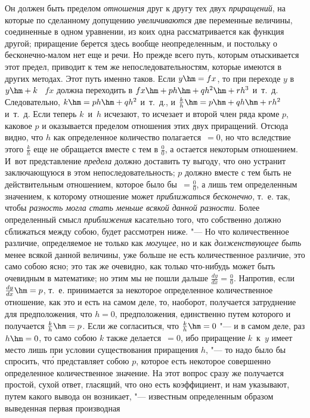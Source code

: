 Он должен быть пределом {\em отношения} друг к другу тех двух {\em приращений},
на которые по сделанному допущению {\em увеличиваются} две переменные величины,
соединенные в одном уравнении, из коих одна рассматривается как функция другой;
приращение берется здесь вообще неопределенным, и постольку о бесконечно-малом
нет еще и речи. Но прежде всего путь, которым отыскивается этот предел,
приводит к тем же непоследовательностям, которые имеются в других методах. Этот
путь именно таков. Если $y\hm=fx$, то при переходе $y$ в $y\hm+k$ \  $fx$
должна переходить в $fx\hm+ph\hm+qh^2\hm+rh^3$ и~т.~д. Следовательно,
$k\hm=ph\hm+qh^2$ и~т.~д., и $\frac k h\hm=p\hm+qh\hm+rh^2$ и~т.~д. Если теперь
$k$~и~$h$ исчезают, то исчезает и второй член ряда кроме $p$, каковое $p$ и
оказывается пределом отношения этих двух приращений. Отсюда видно, что $h$ как
определенное количество полагается~$=0$, но что вследствие этого $\frac k h$
еще не обращается вместе с тем в $\frac 0 0$, а остается некоторым отношением.
И~вот представление {\em предела} должно доставить ту выгоду, что оно устранит
заключающуюся в этом непоследовательность; $p$ должно вместе с тем быть не
действительным отношением, которое было бы~$=\frac 0 0$, а лишь тем
определенным значением, к которому отношение может
{\em приближаться бесконечно}, т.~е. так, чтобы {\em разность могла стать
меньше всякой данной разности}. Более определенный смысл {\em приближения}
касательно того, что собственно должно сближаться между собою, будет рассмотрен
ниже. "--- Но что количественное различие, определяемое не только как {\em
могущее}, но и как {\em долженствующее быть} менее всякой данной величины, уже
больше не есть количественное различие, это само собою ясно; это так же
очевидно, как только что-нибудь может быть очевидным в математике; но этим мы
не пошли дальше $\frac{dy}{dx}=\frac 0 0$. Напротив, если $\frac{dy}{dx}\hm=p$,
т.~е. принимается за некоторое определенное количественное отношение, как это и
есть на самом деле, то, наоборот, получается затруднение для предположения, что
$h=0$, предположения, единственно путем которого и получается $\frac k h\hm=p$.
Если же согласиться, что $\frac k h\hm=0$ "--- и в самом деле, раз $h\hm=0$, то
само собою $k$ также делается~$=0$, ибо приращение $k$~к~$y$ имеет место лишь
при условии существования приращения $h$, "--- то надо было бы спросить,
чт\'{о} представляет собою $p$, которое есть некоторое совершенно определенное
количественное значение. На этот вопрос сразу же получается простой, сухой
ответ, гласящий, что оно есть коэффициент, и нам указывают, путем какого вывода
он возникает, "--- известным определенным образом выведенная первая производная
